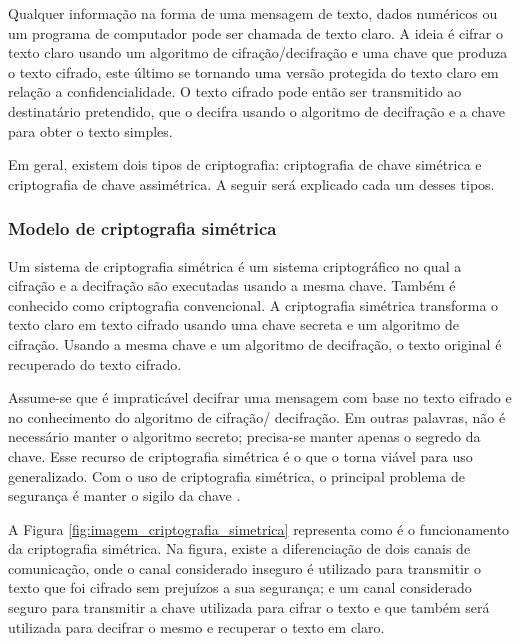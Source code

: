     Qualquer informação na forma de uma mensagem de texto, dados numéricos ou um programa de computador pode ser chamada de texto claro. A ideia é cifrar o texto claro usando um algoritmo de cifração/decifração e uma chave que produza o texto cifrado, este último se tornando uma versão protegida do texto claro em relação a confidencialidade. O texto cifrado pode então ser transmitido ao destinatário pretendido, que o decifra usando o algoritmo de decifração e a chave para obter o texto simples.\cite{beginnig_blockchain_bikramaditya}
    
    Em geral, existem dois tipos de criptografia: criptografia de chave simétrica e criptografia de chave assimétrica. A seguir será explicado cada um desses tipos.

        \subsubsection{Modelo de criptografia simétrica}
        
            Um sistema de criptografia simétrica é um sistema criptográfico no qual a cifração e a decifração são executadas usando a mesma chave. Também é conhecido como criptografia convencional. A criptografia simétrica transforma o texto claro em texto cifrado usando uma chave secreta e um algoritmo de cifração. Usando a mesma chave e um algoritmo de decifração, o texto original é recuperado do texto cifrado.\cite{cryptograpy_and_network_stallings}
            
            Assume-se que é impraticável decifrar uma mensagem com base no texto cifrado e no conhecimento do algoritmo de cifração/ decifração. Em outras palavras, não é necessário manter o algoritmo secreto; precisa-se manter apenas o segredo da chave. Esse recurso de criptografia simétrica é o que o torna viável para uso generalizado. Com o uso de criptografia simétrica, o principal problema de segurança é manter o sigilo da chave \cite{cryptograpy_and_network_stallings}.
            
            A Figura \ref{fig:imagem_criptografia_simetrica} representa como é o funcionamento da criptografia simétrica. Na figura, existe a diferenciação de dois canais de comunicação, onde o canal considerado inseguro é utilizado para transmitir o texto que foi cifrado sem prejuízos a sua segurança; e um canal considerado seguro para transmitir a chave utilizada para cifrar o texto e que também será utilizada para decifrar o mesmo e recuperar o texto em claro.
            
